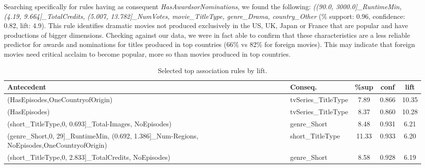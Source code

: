 Searching specifically for rules having as consequent \emph{HasAwardsorNominations}, we found the following: \emph{((90.0, 3000.0]\_RuntimeMin, (4.19, 9.664]\_TotalCredits, (5.007, 13.782]\_NumVotes, movie\_TitleType, genre\_Drama, country\_Other} (\% support: 0.96, confidence: 0.82, lift: 4.9).
This rule identifies dramatic movies not produced exclusively in the US, UK, Japan or France that are popular and have productions of bigger dimensions.
Checking against our data, we were in fact able to confirm that these characteristics are a less reliable predictor for awards and nominations for titles produced in top countries (66\% vs 82\% for foreign movies).
This may indicate that foreign movies need critical acclaim to become popular, more so than movies produced in top countries.

\begin{table}
    \small  %
    \setlength{\tabcolsep}{3pt}  %
    \centering
    \begin{tabular}{p{3cm}p{1.4cm}ccc}
    \toprule
    \textbf{Antecedent} & \textbf{Conseq.} & \textbf{\%sup} & \textbf{conf} & \textbf{lift} \\
    \midrule
    (HasEpisodes,\newline OneCountryofOrigin) & tvSeries\newline \_TitleType & 7.89 & 0.866 & 10.35 \\
    (HasEpisodes) & tvSeries\newline \_TitleType & 8.37 & 0.860 & 10.28 \\
    (short\_TitleType,\newline {[}0, 0.693{]}\_Total-\newline Images, NoEpisodes) & genre\newline\_Short & 8.48 & 0.931 & 6.21 \\
    (genre\_Short,\newline {[}0, 29{]}\_RuntimeMin, \newline(0.692, 1.386]\_Num-\newline Regions, NoEpisodes,\newline OneCountryofOrigin) & short\newline \_TitleType & 11.33 & 0.933 & 6.20 \\
    (short\_TitleType,\newline {[}0, 2.833{]}\_TotalCredits, NoEpisodes) & genre\newline\_Short & 8.58 & 0.928 & 6.19 \\
    \bottomrule
    \end{tabular}
    \caption{Selected top association rules by lift.}
    \label{tab:top_association_rules}
\end{table}


